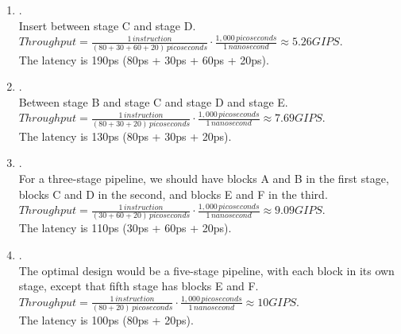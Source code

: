\documentclass{article}
\begin{document}
\begin{enumerate}[label=\textbf{\Alph*.}]
	\item . \\
	Insert between stage C and stage D. \\
	$Throughput = \frac{1\,instruction}{(80 + 30 + 60 + 20)\,picoseconds} \cdot
	\frac{1,000\,picoseconds}{1\,nanosecond} \approx 5.26 GIPS$. \\
	The latency is 190ps (80ps + 30ps + 60ps + 20ps). \\
	\item . \\
	Between stage B and stage C and stage D and stage E. \\
	$Throughput = \frac{1\,instruction}{(80 + 30 + 20)\,picoseconds} \cdot
	\frac{1,000\,picoseconds}{1\,nanosecond} \approx 7.69 GIPS$. \\
	The latency is 130ps (80ps + 30ps + 20ps). \\
	\item . \\
	For a three-stage pipeline, we should have blocks A and B in the first stage,
	blocks C and D in the second, and blocks E and F in the third. \\
	$Throughput = \frac{1\,instruction}{(30 + 60 + 20)\,picoseconds} \cdot
	\frac{1,000\,picoseconds}{1\,nanosecond} \approx 9.09 GIPS$. \\
	The latency is 110ps (30ps + 60ps + 20ps). \\
	\item . \\
	The optimal design would be a five-stage pipeline, with each block in its own
	stage, except that fifth stage has blocks E and F.
	$Throughput = \frac{1\,instruction}{(80 + 20)\,picoseconds} \cdot
	\frac{1,000\,picoseconds}{1\,nanosecond} \approx 10 GIPS$. \\
	The latency is 100ps (80ps + 20ps). \\
\end{enumerate}
\end{document}
